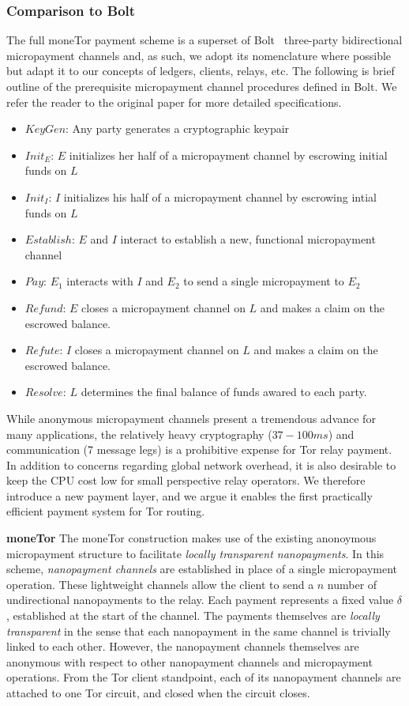 \subsubsection{Comparison to Bolt}

The full moneTor payment scheme is a superset of Bolt~\cite{green2017bolt} three-party bidirectional
micropayment channels and, as such, we adopt its nomenclature where possible but
adapt it to our concepts of ledgers, clients, relays, etc. The following is brief
outline of the prerequisite micropayment channel procedures defined in Bolt. We
refer the reader to the original paper for more detailed
specifications.

\begin{itemize}
\item $KeyGen$: Any party generates a cryptographic keypair
\item $Init_E$: $E$ initializes her half of a micropayment channel by escrowing
  initial funds on $L$
\item $Init_I$: $I$ initializes his half of a micropayment channel by
  escrowing intial funds on $L$
\item $Establish$: $E$ and $I$ interact to establish a new, functional
  micropayment channel
\item $Pay$: $E_1$ interacts with $I$ and $E_2$ to send a single micropayment to $E_2$
\item $Refund$: $E$ closes a micropayment channel on $L$ and makes a claim on
  the escrowed balance.
\item $Refute$: $I$ closes a micropayment channel on $L$ and makes a claim on
  the escrowed balance.
\item $Resolve$: $L$ determines the final balance of funds awared to
  each party.
\end{itemize}

While anonymous micropayment channels present a tremendous advance for many
applications, the relatively heavy cryptography ($37-100 ms$) and communication
(7 message legs) is a prohibitive expense for Tor relay payment. In addition to
concerns regarding global network overhead, it is also desirable to keep the
CPU cost low for small perspective relay operators. We therefore
introduce a new payment layer, and we argue it enables the first practically efficient
payment system for Tor routing.

\textbf{moneTor} The moneTor construction makes use of the existing anonoymous
micropayment structure to facilitate \emph{locally transparent nanopayments}. In
this scheme, \emph{nanopayment channels} are established in place of a single
micropayment operation. These lightweight channels allow the client to send a
$n$ number of undirectional nanopayments to the relay. Each payment represents a
fixed value $\delta$, established at the start of the channel. The payments
themselves are \emph{locally transparent} in the sense that each nanopayment in
the same channel is trivially linked to each other. However, the nanopayment
channels themselves are anonymous with respect to other nanopayment channels and
micropayment operations. From the Tor client standpoint, each of its nanopayment channels are attached to one Tor circuit, and closed when the circuit closes.

